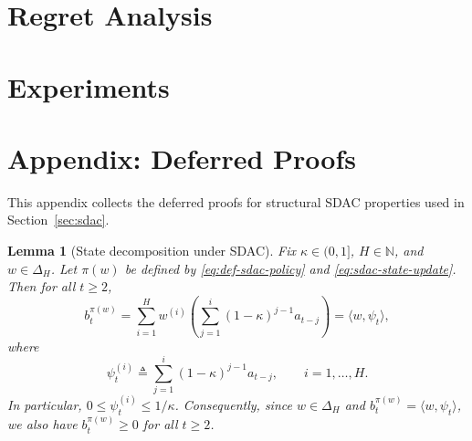 \documentclass[11pt]{article}
\newtheorem{lemma}{Lemma}
\begin{document}
\section{Regret Analysis}
\label{sec:regret-analysis}


\section{Experiments}
\label{sec:experiments}


\appendix
\section{Appendix: Deferred Proofs}
\label{sec:appendix-proofs}

This appendix collects the deferred proofs for structural SDAC properties used in Section~\ref{sec:sdac}.

\begin{lemma}[State decomposition under SDAC]
\label{lem:appendix-state-decomp}
Fix $\kappa\in(0,1]$, $H\in\mathbb{N}$, and $w\in\Delta_H$. Let $\pi(w)$ be defined by \eqref{eq:def-sdac-policy} and \eqref{eq:sdac-state-update}. Then for all $t\ge 2$,
\begin{equation}
\label{eq:appendix-state-decomp}
b_t^{\pi(w)}
=
\sum_{i=1}^H w^{(i)}\!\left(\sum_{j=1}^{i}(1-\kappa)^{j-1}a_{t-j}\right)
= \langle w,\psi_t\rangle,
\end{equation}
where
\[
\psi_t^{(i)} \triangleq \sum_{j=1}^{i}(1-\kappa)^{j-1}a_{t-j}, \qquad i=1,\ldots,H.
\]
In particular, $0\le \psi_t^{(i)}\le 1/\kappa$. Consequently, since $w\in\Delta_H$ and
$b_t^{\pi(w)}=\langle w,\psi_t\rangle$, we also have $b_t^{\pi(w)}\ge 0$ for all $t\ge 2$.
\end{lemma}
\end{document}
